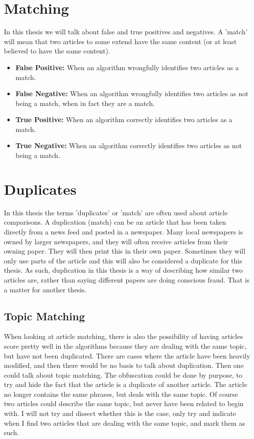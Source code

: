 \section{Matching}
In this thesis we will talk about false and true positives and negatives. A 'match' will mean that two articles to some extend have the same content (or at least believed to have the same content).

\begin{itemize}
\item \textbf{False Positive:} When an algorithm wrongfully identifies two articles as a match.
\item \textbf{False Negative:} When an algorithm wrongfully identifies two articles as not being a match, when in fact they are a match.
\item \textbf{True Positive:} When an algorithm correctly identifies two articles as a match.
\item \textbf{True Negative:} When an algorithm correctly identifies two articles as not being a match.
\end{itemize}


\section{Duplicates}
In this thesis the terms 'duplicates' or 'match' are often used about article comparisons. A duplication (match) can be an article that has been taken directly from a news feed and posted in a newspaper. Many local newspapers is owned by larger newspapers, and they will often receive articles from their owning paper. They will then print this in their own paper. Sometimes they will only use parts of the article and this will also be considered a duplicate for this thesis. As such, duplication in this thesis is a way of describing how similar two articles are, rather than saying different papers are doing conscious fraud. That is a matter for another thesis. 

\subsection{Topic Matching}
When looking at article matching, there is also the possibility of having articles score pretty well in the algorithms because they are dealing with the same topic, but have not been duplicated. There are cases where the article have been heavily modified, and then there would be no basis to talk about duplication. Then one could talk about topic matching. The obfuscation could be done by purpose, to try and hide the fact that the article is a duplicate of another article. The article no longer contains the same phrases, but deals with the same topic.
Of course two articles could describe the same topic, but never have been related to begin with. I will not try and dissect whether this is the case, only try and indicate when I find two articles that are dealing with the same topic, and mark them as such. 

